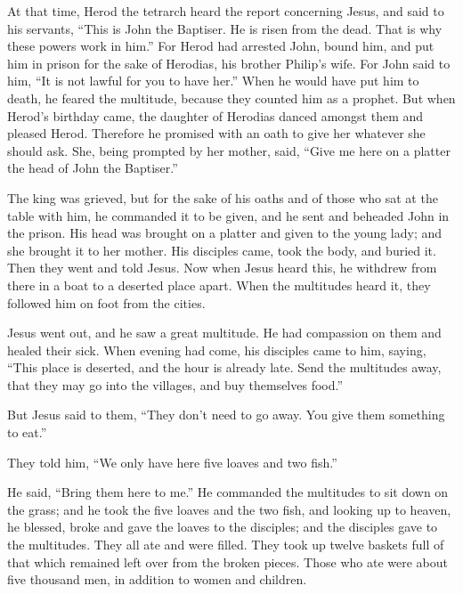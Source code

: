  At that time, Herod the tetrarch heard the report
concerning Jesus,  and said to his servants, ``This is John
the Baptiser. He is risen from the dead. That is why these powers work
in him.''  For Herod had arrested John, bound him, and put
him in prison for the sake of Herodias, his brother Philip's wife.
 For John said to him, ``It is not lawful for you to have
her.''  When he would have put him to death, he feared the
multitude, because they counted him as a prophet.  But when
Herod's birthday came, the daughter of Herodias danced amongst them and
pleased Herod.  Therefore he promised with an oath to give
her whatever she should ask.  She, being prompted by her
mother, said, ``Give me here on a platter the head of John the
Baptiser.''

 The king was grieved, but for the sake of his oaths and of
those who sat at the table with him, he commanded it to be given,
 and he sent and beheaded John in the prison. 
His head was brought on a platter and given to the young lady; and she
brought it to her mother.  His disciples came, took the
body, and buried it. Then they went and told Jesus.  Now
when Jesus heard this, he withdrew from there in a boat to a deserted
place apart. When the multitudes heard it, they followed him on foot
from the cities.

 Jesus went out, and he saw a great multitude. He had
compassion on them and healed their sick.  When evening had
come, his disciples came to him, saying, ``This place is deserted, and
the hour is already late. Send the multitudes away, that they may go
into the villages, and buy themselves food.''

 But Jesus said to them, ``They don't need to go away. You
give them something to eat.''

 They told him, ``We only have here five loaves and two
fish.''

 He said, ``Bring them here to me.''  He
commanded the multitudes to sit down on the grass; and he took the five
loaves and the two fish, and looking up to heaven, he blessed, broke and
gave the loaves to the disciples; and the disciples gave to the
multitudes.  They all ate and were filled. They took up
twelve baskets full of that which remained left over from the broken
pieces.  Those who ate were about five thousand men, in
addition to women and children.

